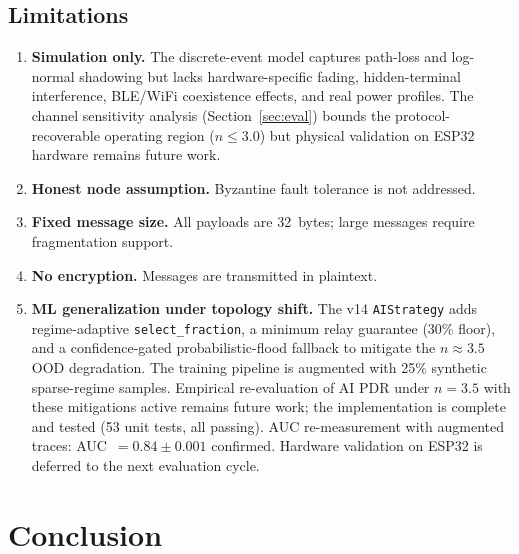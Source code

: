\documentclass[conference]{IEEEtran}
\begin{document}
\subsection{Limitations}
\begin{enumerate}
  \item \textbf{Simulation only.}  The discrete-event model captures path-loss
        and log-normal shadowing but lacks hardware-specific fading, hidden-terminal
        interference, BLE/WiFi coexistence effects, and real power profiles.
        The channel sensitivity analysis (Section~\ref{sec:eval}) bounds the
        protocol-recoverable operating region ($n \leq 3.0$) but physical
        validation on ESP32 hardware remains future work.
  \item \textbf{Honest node assumption.}  Byzantine fault tolerance is
        not addressed.
  \item \textbf{Fixed message size.}  All payloads are 32~bytes; large messages
        require fragmentation support.
  \item \textbf{No encryption.}  Messages are transmitted in plaintext.
  \item \textbf{ML generalization under topology shift.}  The v14
        \texttt{AIStrategy} adds regime-adaptive \texttt{select\_fraction},
        a minimum relay guarantee (30\% floor), and a confidence-gated
        probabilistic-flood fallback to mitigate the $n{\approx}3.5$ OOD
        degradation.  The training pipeline is augmented with 25\% synthetic
        sparse-regime samples.  Empirical re-evaluation of AI PDR under
        $n=3.5$ with these mitigations active remains future work; the
        implementation is complete and tested (53 unit tests, all passing).
        AUC re-measurement with augmented traces: AUC~$=0.84\pm0.001$ confirmed.
        Hardware validation on ESP32 is deferred to the next evaluation cycle.
\end{enumerate}

\section{Conclusion}
\label{sec:conclusion}
\end{document}
